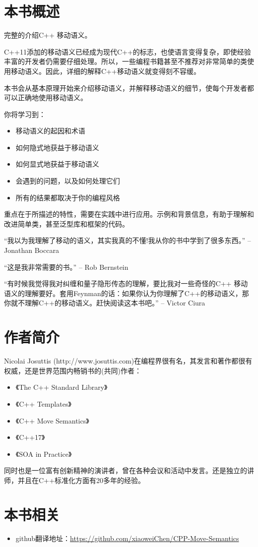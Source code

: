 
\section*{本书概述}

完整的介绍C++ 移动语义。

C++11添加的移动语义已经成为现代C++的标志，也使语言变得复杂，即使经验丰富的开发者仍需要仔细处理。所以，一些编程书籍甚至不推荐对非常简单的类使用移动语义。因此，详细的解释C++移动语义就变得刻不容缓。

本书会从基本原理开始来介绍移动语义，并解释移动语义的细节，使每个开发者都可以正确地使用移动语义。

你将学习到：

\begin{itemize}
    \item 移动语义的起因和术语
    \item 如何隐式地获益于移动语义
    \item 如何显式地获益于移动语义
    \item 会遇到的问题，以及如何处理它们
    \item 所有的结果都取决于你的编程风格
\end{itemize}

重点在于所描述的特性，需要在实践中进行应用。示例和背景信息，有助于理解和改进简单类，甚至泛型库和框架的代码。

“我以为我理解了移动的语义，其实我真的不懂!我从你的书中学到了很多东西。”	-- Jonathan Boccara

“这是我非常需要的书。” -- Rob Bernstein

“有时候我觉得我对纠缠和量子隐形传态的理解，要比我对一些奇怪的C++ 移动语义的理解要好。套用Feynman的话：如果你认为你理解了C++的移动语义，那你就不理解C++的移动语义。赶快阅读这本书吧。”	-- Victor Ciura


\section*{作者简介}
Nicolai Josuttis (http://www.josuttis.com)在编程界很有名，其发言和著作都很有权威，还是世界范围内畅销书的(共同)作者：

\begin{itemize}
    \item 《The C++ Standard Library》
    \item 《C++ Templates》
    \item 《C++ Move Semantics》
    \item 《C++17》
    \item 《SOA in Practice》
\end{itemize}

同时也是一位富有创新精神的演讲者，曾在各种会议和活动中发言。还是独立的讲师，并且在C++标准化方面有20多年的经验。

\section*{本书相关}
\begin{itemize}
    \item github翻译地址：\href{https://github.com/xiaoweiChen/CPP-Move-Semantics}{https://github.com/xiaoweiChen/CPP-Move-Semantics}
\end{itemize}